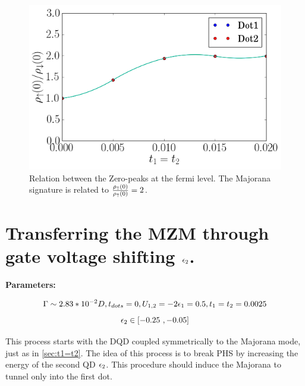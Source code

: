 \begin{figure}[H]
\centering
\includegraphics[scale=0.4]{Plots/MSig/Shift_t1=t2.png}
\caption{\label{fig:MSig/Shift_t1=t2} Relation between the Zero-peaks at the fermi level. The Majorana signature is related to $\frac{\rho_\uparrow(0)}{\rho_\uparrow(0)}=2$.}
\end{figure}
\fi





















\section{Transferring the MZM through gate voltage shifting $\epsilon_{2}$. \label{sec:e2}}

\textbf{Parameters:}

$$\Gamma \sim 2.83*10^{-2}D, t_{dots}=0 , U_{1,2} = -2\epsilon_{1} = 0.5 , t_1=t_2=0.0025$$
$$\epsilon_{2} \in [-0.25 \  , -0.05]$$

This process starts with the DQD coupled symmetrically  to the Majorana mode, just as in \ref{sec:t1=t2}. The idea of this process is to break PHS by increasing the energy of the second QD $\epsilon_{2}$. This procedure should induce the Majorana to tunnel only into the first dot. 


